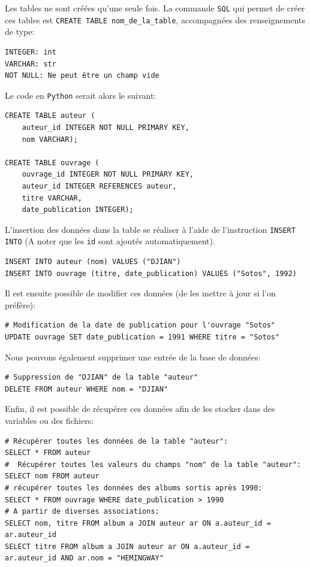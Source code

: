 \documentclass[a4paper,12pt]{book}
\begin{document}
Les tables ne sont créées qu'une seule fois. La commande \texttt{SQL} qui permet de créer ces tables est \texttt{CREATE TABLE nom\_de\_la\_table}, accompagnées des renseignements de type:
\begin{verbatim}
INTEGER: int
VARCHAR: str
NOT NULL: Ne peut être un champ vide
\end{verbatim}
\medskip

Le code en \texttt{Python} serait alors le suivant:
\begin{lstlisting}
CREATE TABLE auteur (
    auteur_id INTEGER NOT NULL PRIMARY KEY, 
    nom VARCHAR);

CREATE TABLE ouvrage (
    ouvrage_id INTEGER NOT NULL PRIMARY KEY,
    auteur_id INTEGER REFERENCES auteur, 
    titre VARCHAR,
    date_publication INTEGER);
\end{lstlisting}
\medskip

L'insertion des données dans la table se réaliser à l'aide de l'instruction \texttt{INSERT INTO} (A noter que les \texttt{id} sont ajoutés automatiquement).
\begin{lstlisting}
INSERT INTO auteur (nom) VALUES ("DJIAN")
INSERT INTO ouvrage (titre, date_publication) VALUES ("Sotos", 1992)
\end{lstlisting}
\medskip

Il est ensuite possible de modifier ces données (de les mettre à jour si l'on préfère):
\begin{lstlisting}
# Modification de la date de publication pour l'ouvrage "Sotos"
UPDATE ouvrage SET date_publication = 1991 WHERE titre = "Sotos"
\end{lstlisting}
\medskip

Nous pouvons également supprimer une entrée de la base de données:
\begin{lstlisting}
# Suppression de "DJIAN" de la table "auteur"
DELETE FROM auteur WHERE nom = "DJIAN"
\end{lstlisting}
\medskip

Enfin, il est possible de récupérer ces données afin de les stocker dans des variables ou des fichiers:
\begin{lstlisting} 
# Récupérer toutes les données de la table "auteur":
SELECT * FROM auteur  
#  Récupérer toutes les valeurs du champs "nom" de la table "auteur":
SELECT nom FROM auteur  
# récupérer toutes les données des albums sortis après 1990:
SELECT * FROM ouvrage WHERE date_publication > 1990 
# A partir de diverses associations: 
SELECT nom, titre FROM album a JOIN auteur ar ON a.auteur_id = 
ar.auteur_id  
SELECT titre FROM album a JOIN auteur ar ON a.auteur_id = 
ar.auteur_id AND ar.nom = "HEMINGWAY"  
\end{lstlisting}
\medskip
\end{document}
